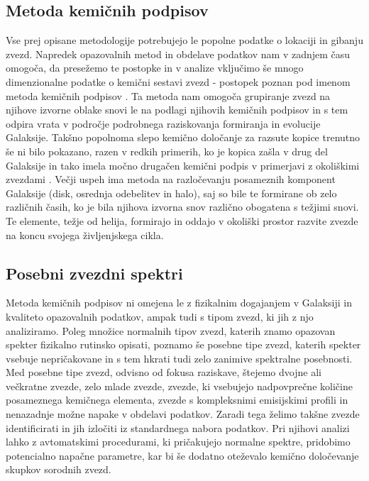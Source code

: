 \subsection{Metoda kemičnih podpisov}
Vse prej opisane metodologije potrebujejo le popolne podatke o lokaciji in gibanju zvezd. Napredek opazovalnih metod in obdelave podatkov nam v zadnjem času omogoča, da presežemo te postopke in v analize vključimo še mnogo dimenzionalne podatke o kemični sestavi zvezd - postopek poznan pod imenom metoda kemičnih podpisov \cite{2002ARA&A..40..487F, 2010ApJ...721..582B}. Ta metoda nam omogoča grupiranje zvezd na njihove izvorne oblake snovi le na podlagi njihovih kemičnih podpisov in s tem odpira vrata v področje podrobnega raziskovanja formiranja in evolucije Galaksije. Takšno popolnoma slepo kemično določanje za razsute kopice trenutno še ni bilo pokazano, razen v redkih primerih, ko je kopica zašla v drug del Galaksije in tako imela močno drugačen kemični podpis v primerjavi z okoliškimi zvezdami \cite{2016ApJ...833..262H}. Večji uspeh ima metoda na razločevanju posameznih komponent Galaksije (disk, osrednja odebelitev in halo), saj so bile te formirane ob zelo različnih časih, ko je bila njihova izvorna snov različno obogatena s težjimi snovi. Te elemente, težje od helija, formirajo in oddajo v okoliški prostor razvite zvezde na koncu svojega življenjskega cikla.

\subsection{Posebni zvezdni spektri}
Metoda kemičnih podpisov ni omejena le z fizikalnim dogajanjem v Galaksiji in kvaliteto opazovalnih podatkov, ampak tudi s tipom zvezd, ki jih z njo analiziramo. Poleg množice normalnih tipov zvezd, katerih znamo opazovan spekter fizikalno rutinsko opisati, poznamo še posebne tipe zvezd, katerih spekter vsebuje nepričakovane in s tem hkrati tudi zelo zanimive spektralne posebnosti. Med posebne tipe zvezd, odvisno od fokusa raziskave, štejemo dvojne ali večkratne zvezde, zelo mlade zvezde, zvezde, ki vsebujejo nadpovprečne količine posameznega kemičnega elementa, zvezde s kompleksnimi emisijskimi profili in nenazadnje možne napake v obdelavi podatkov. Zaradi tega želimo takšne zvezde identificirati in jih izločiti iz standardnega nabora podatkov. Pri njihovi analizi lahko z avtomatskimi procedurami, ki pričakujejo normalne spektre, pridobimo potencialno napačne parametre, kar bi še dodatno oteževalo kemično določevanje skupkov sorodnih zvezd.

